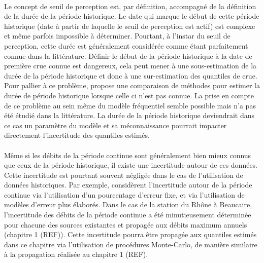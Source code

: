 \documentclass[11pt]{article}
\begin{document}
	\paragraph{} Le concept de seuil de perception est, par définition, accompagné de la définition de la durée de la période historique. Le date qui marque le début de cette période historique (date à partir de laquelle le seuil de perception est actif) est complexe et même parfois impossible à déterminer. Pourtant, à l'instar du seuil de perception, cette durée est généralement considérée comme étant parfaitement connue dans la littérature. Définir le début de la période historique à la date de première crue connue est dangereux, cela peut mener à une sous-estimation de la durée de la période historique et donc à une sur-estimation des quantiles de crue. Pour pallier à ce problème, \cite{prosdocimi_german_2018} propose une comparaison de méthodes pour estimer la durée de période historique lorsque celle ci n'est pas connue. La prise en compte de ce problème au sein même du modèle fréquentiel semble possible mais n'a pas été étudié dans la littérature. La durée de la période historique deviendrait dans ce cas un paramètre du modèle et sa méconnaissance pourrait impacter directement l'incertitude des quantiles estimés. 	
	
	\paragraph{} Même si les débits de la période continue sont généralement bien mieux connus que ceux de la période historique, il existe une incertitude autour de ces données. Cette incertitude est pourtant souvent négligée dans le cas de l'utilisation de données historiques. Par exemple, \cite{parkes_defining_2016} considèrent l'incertitude autour de la période continue via l'utilisation d'un pourcentage d'erreur fixe, et \cite{neppel_flood_2010} via l'utilisation de modèles d'erreur plus élaborés. Dans le cas de la station du Rhône à Beaucaire, l'incertitude des débits de la période continue a été minutieusement déterminée pour chacune des sources existantes et propagée aux débits maximum annuels (chapitre 1 (REF)). Cette incertitude pourra être propagée aux quantiles estimés dans ce chapitre via l'utilisation de procédures Monte-Carlo, de manière similaire à la propagation réalisée au chapitre 1 (REF).
	
\end{document}
